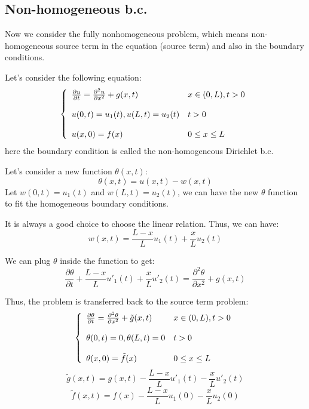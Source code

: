 \documentclass[12pt]{article} %
\begin{document}
\subsection{Non-homogeneous b.c.}
\hspace{5mm}Now we consider the fully nonhomogeneous problem, which means non-homogeneous source term in the equation (source term) and also in the boundary conditions.\par
Let's consider the following equation:
\begin{equation}
\left \{ \begin{array}{llc}
\pdv{u}{t} =\frac{\partial^{2}u}{\partial x^{2}} + g(x, t)& x \in (0,L),  t>0 \\ 
\\
u(0,t) = u_{1}(t), u(L, t) = u_{2}(t)& t>0 \\ 
\\
u(x, 0) = f(x) & 0 \leq x \leq L
\end{array}\right.
\end{equation}here the boundary condition is called the non-homogeneous Dirichlet b.c.\par
Let's consider a new function $\theta(x, t)$:
$$
\theta(x, t) = u(x, t) -w(x, t)
$$Let $w(0, t) = u_{1}(t)$ and $w(L, t) = u_{2}(t)$, we can have the new $\theta$ function to fit the homogeneous boundary conditions.\par
It is always a good choice to choose the linear relation. Thus, we can have:
$$
w(x, t) = \frac{L-x}{L}u_{1}(t) + \frac{x}{L}u_{2}(t)
$$\par
We can plug $\theta$ inside the function to get:
$$
\frac{\partial \theta}{\partial t} + \frac{L-x}{L}u'_{1}(t)+\frac{x}{L}u'_{2}(t) = \frac{\partial^{2} \theta}{\partial x^{2}} + g(x, t)
$$\par
Thus, the problem is transferred back to the source term problem:
\begin{equation}
\left \{ \begin{array}{llc}
\pdv{\theta}{t} =\frac{\partial^{2}\theta}{\partial x^{2}} + \tilde{g}(x, t)& x \in (0,L),  t>0 \\ 
\\
\theta(0,t) = 0, \theta(L, t) = 0& t>0 \\ 
\\
\theta(x, 0) = \tilde{f}(x) & 0 \leq x \leq L
\end{array}\right.
\end{equation}
$$
\tilde{g}(x, t) = g(x, t) -\frac{L-x}{L}u'_{1}(t)-\frac{x}{L}u'_{2}(t)
$$
$$
\tilde{f}(x, t) = f(x)-\frac{L-x}{L}u_{1}(0)-\frac{x}{L}u_{2}(0)
$$
\end{document}
